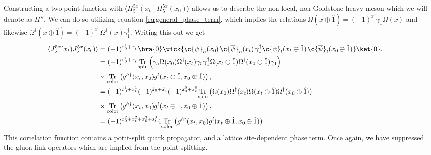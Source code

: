 Constructing a two-point function with $\langle H^{5x}_{5}(x_t)H^{5x}_{5}(x_0)\rangle$ allows us to describe the non-local, non-Goldstone heavy meson which we will denote as $H''$.  We can do so utilizing equation \ref{eq:general_phase_term}, which implies the relations $\Omega(x\oplus\hat1) = (-1)^{x^0}\gamma_1\Omega(x)$ and likewise $\Omega^\dagger(x\oplus\hat1) = (-1)^{x^0}\Omega^\dagger(x)\gamma^\dagger_1$.  Writing this out we get
\begin{equation}\label{eq:x2pt}
\begin{split}
    \langle J^{5x}_{5}(x_t)J^{5x}_{5}(x_0)\rangle &= (-1)^{x_0^1+x_t^1}\bra{0}\wick{
    \c{\psi}_h(x_0)\, \c{\overline{\psi}}_h(x_t)\, \gamma_1^\dagger \c{\psi}_l(x_t\oplus\hat1)\,\c{\overline{\psi}}_l(x_0\oplus\hat1)}\ket{0},\\
    &= (-1)^{x_0^1+x_t^1}\mathrm{\underset{{spin}}{Tr}}\left(\gamma_5\Omega(x_0)\Omega^\dagger(x_t)\gamma_5 \gamma^\dagger_1\Omega(x_t\oplus \hat1)\Omega^\dagger(x_0\oplus \hat1)\gamma_1  \right)\\
    &\times \mathrm{\underset{{color}}{Tr}}\left(g^{h\dagger}(x_t,x_0)g^l(x_t\oplus \hat1,x_0\oplus\hat1)\right),\\
    &= (-1)^{x_0^1+x_t^1}(-1)^{\tilde{x}_0+\tilde{x}_t}(-1)^{x^0_0+x^0_t}\mathrm{\underset{{spin}}{Tr}}\left(\Omega(x_0)\Omega^\dagger(x_t) \Omega(x_t\oplus \hat1)\Omega^\dagger(x_0\oplus \hat1) \right)\\
    &\times \mathrm{\underset{{color}}{Tr}}\left(g^{h\dagger}(x_t,x_0)g^l(x_t\oplus \hat1,x_0\oplus\hat1)\right),\\
    &= (-1)^{{x}^2_0+{x}^2_t+x^3_0+x^3_t} 4\mathrm{\underset{{color}}{Tr}}\left(g^{h\dagger}(x_t,x_0)g^l(x_t\oplus \hat1,x_0\oplus\hat1)\right).
\end{split}
\end{equation}
This correlation function contains a point-split quark propagator, and a lattice site-dependent phase term.  Once again, we have suppressed the gluon link operators which are implied from the point splitting.

